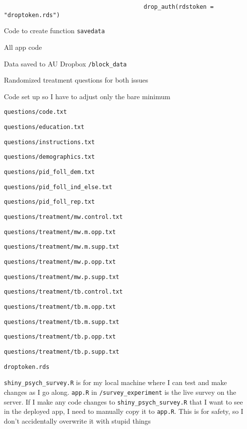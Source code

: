 \documentclass[12pt]{article}
\begin{document}
\begin{coi}
\begin{coi}
\begin{coi}
\begin{coi}
									\begin{verbatim}
										drop_auth(rdstoken = "droptoken.rds")
									\end{verbatim}
								\item Code to create function {\tt savedata}
								\item All app code
								\item Data saved to AU Dropbox {\tt /block\_data}
								\item Randomized treatment questions for both issues
								\item Code set up so I have to adjust only the bare minimum
							\end{coi}
						\item {\tt questions/code.txt}
						\item {\tt questions/education.txt}
						\item {\tt questions/instructions.txt}
						\item {\tt questions/demographics.txt}
						\item \texttt{questions/pid\_foll\_dem.txt}
						\item \texttt{questions/pid\_foll\_ind\_else.txt}
						\item \texttt{questions/pid\_foll\_rep.txt}
						\item {\tt questions/treatment/mw.control.txt}
						\item {\tt questions/treatment/mw.m.opp.txt}
						\item {\tt questions/treatment/mw.m.supp.txt}
						\item {\tt questions/treatment/mw.p.opp.txt}
						\item {\tt questions/treatment/mw.p.supp.txt}
						\item {\tt questions/treatment/tb.control.txt}
						\item {\tt questions/treatment/tb.m.opp.txt}
						\item {\tt questions/treatment/tb.m.supp.txt}
						\item {\tt questions/treatment/tb.p.opp.txt}
						\item {\tt questions/treatment/tb.p.supp.txt}
						\item {\tt droptoken.rds}
					\end{coi}
			\end{coi}
		\item {\tt shiny\_psych\_survey.R} is for my local machine where I can test and make changes as I go along. {\tt app.R} in {\tt /survey\_experiment} is the live survey on the server. If I make any code changes to {\tt shiny\_psych\_survey.R} that I want to see in the deployed app, I need to manually copy it to {\tt app.R}. This is for safety, so I don't accidentally overwrite it with stupid things

\end{coi}
\end{document}

